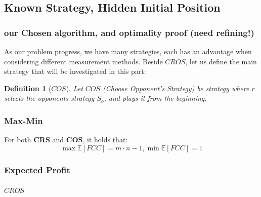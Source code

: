 \documentclass[a4paper,10pt]{article}
\newcommand\rob{\ensuremath{r}\xspace}
\newcommand\opp{\ensuremath{o}\xspace}
\newcommand{\fcc}{\ensuremath{FCC}\xspace}
\newcommand{\cros}{\ensuremath{CROS}\xspace}
\newcommand{\coos}{\ensuremath{COS}\xspace}
\newtheorem{definition}{Definition}
\begin{document}
\subsection{Known Strategy, Hidden Initial Position}
\subsubsection{our Chosen algorithm, and optimality proof (need refining!)}
As our problem progress, we have many strategies, each has an advantage when considering different measurement methods. 
Beside \textbf{\cros}, let us define the main strategy that will be investigated in this part:
\begin{definition}[\textbf{\coos}]
Let \textbf{\coos} (Choose Opponent's Strategy) be strategy where \rob selects the opponents strategy $S_{\opp}$, and plays it from the beginning.
\end{definition}

\subsubsection{Max-Min}
For both \textbf{CRS} and \textbf{COS}, it holds that: \[\max\mathbb{E}[\fcc]=m\cdot n-1, \min\mathbb{E}[\fcc]=1\]

\subsubsection{Expected Profit}

\paragraph*{\cros}
\end{document}
